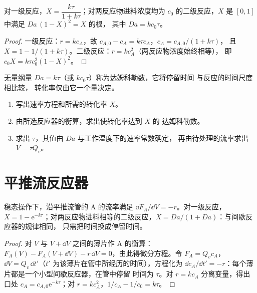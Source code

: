 \begin{theorem}[搅拌釜中的转化率]\label{thm:b2:continuous-reactors:cstr}
对一级反应，$X = \dfrac{k\tau}{1 + k\tau}$；对两反应物进料浓度均为
$c_0$ 的二级反应，$X$ 是 $[0, 1]$ 中满足 $Da\,(1 - X)^2 = X$ 的根，
其中 $Da =
kc_0\tau$。
\end{theorem}

\begin{proof}
一级反应：$r = kc_A$，故 $c_{A,0} - c_A = k\tau c_A$，$c_A = c_{A,0}/(1 + k\tau)$，
且 $X = 1 - 1/(1 + k\tau)$。二级反应：$r = kc_A^2$（两反应物浓度始终相等），
即 $c_0X = k\tau c_0^2(1 - X)^2$。
\end{proof}

无量纲量 $Da = k\tau$（或 $kc_0\tau$）称为达姆科勒数，它将停留时间
与反应的时间尺度相比较，
转化率仅由它一个量决定。

\begin{method}[反应器的设计]\label{met:b2:continuous-reactors:size-reactor}
\begin{enumerate}
  \item 写出速率方程和所需的转化率 $X$。
  \item 由所选反应器的衡算，求出使转化率达到 $X$ 的
        达姆科勒数。
  \item 求出 $\tau$，其值由 $Da$ 与工作温度下的速率常数确定，
        再由待处理的流率求出 $V = \tau Q_v$。
\end{enumerate}
\end{method}

\section{平推流反应器}

\begin{theorem}[平推流反应器中的转化率]\label{thm:b2:continuous-reactors:pfr}
稳态操作下，沿平推流管的 A 的流率满足
$\dd F_A/\dd V = -r$。对一级反应，$X = 1 -
\mathrm e^{-k\tau}$；对两反应物进料相等的二级反应，$X =
Da/(1 + Da)$：与间歇反应器的规律相同，
只需把时间换成停留时间。
\end{theorem}

\begin{proof}
对 $V$ 与 $V + \dd V$ 之间的薄片作 A 的衡算：$F_A(V) - F_A(V + \dd V)
- r\,\dd V = 0$，由此得微分方程。令 $F_A = Q_vc_A$，
$\dd V = Q_v\,\dd t'$（$t'$ 为该薄片在管中所经历的时间），方程化为
$\dd c_A/\dd t' = -r$：每个薄片都是一个小型间歇反应器，在管中停留
时间为 $\tau$。对 $r = kc_A$ 分离变量，得出口处 $c_A = c_{A,0}
\mathrm e^{-k\tau}$；对 $r = kc_A^2$，$1/c_A - 1/c_0 = k\tau$。
\end{proof}

